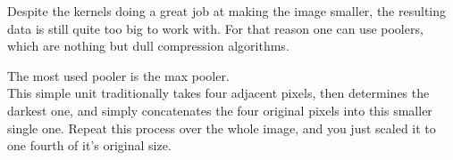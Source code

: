 Despite the kernels doing a great job at making the image smaller, the resulting data is still quite too big to work with.  
For that reason one can use poolers, which are nothing but dull compression algorithms.
 
The most used pooler is the max pooler. \cite{Graham2014}  \\
This simple unit traditionally takes four adjacent pixels, then determines the darkest one, and simply concatenates the four original pixels into this smaller single one.  
Repeat this process over the whole image, and you just scaled it to one fourth of it's original size.